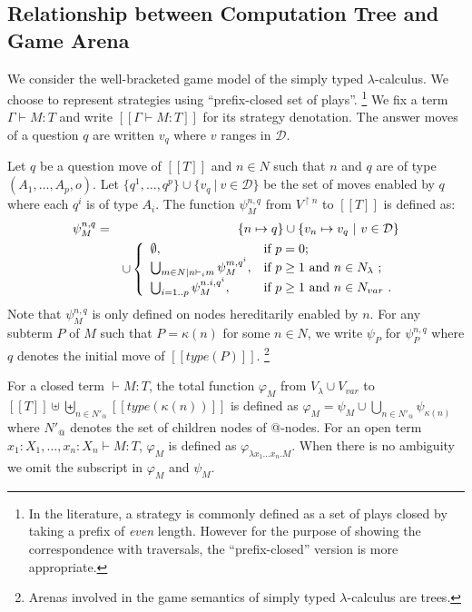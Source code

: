 \documentclass{llncs}
\newcommand\union{\cup}
\newcommand\Union{\bigcup}
\newcommand{\sem}[1]{{[\![ #1 ]\!]}}
\begin{document}
\subsection{Relationship between Computation Tree and Game Arena}
We consider the well-bracketed game model of the simply typed $\lambda$-calculus.
We choose to represent strategies using ``prefix-closed set of plays''.
\footnote{In the literature, a strategy is commonly defined as a set of plays
closed by taking a prefix of \emph{even} length. However for the purpose of showing the correspondence with traversals, the ``prefix-closed'' version is more appropriate.}
We fix a term $\Gamma \vdash M : T$ and write $\sem{\Gamma \vdash M : T}$ for its strategy denotation.
The answer moves of a question $q$ are written $v_q$ where $v$ ranges in $\mathcal{D}$.

\begin{definition}
\label{def:phi_psi mapping}
Let $q$ be a question move of $\sem{T}$ and $n \in N$ such that $n$ and $q$ are of type
$(A_1,\ldots,A_p,o)$.
Let $\{ q^1, \ldots, q^p \} \union \{  v_q \ | \ v \in \mathcal{D} \}$ be the set of moves enabled by $q$ where each $q^i$
is of type $A_i$. The function $\psi_M^{n,q}$ from $V^{\upharpoonright n}$ to $\sem{T}$ is defined as:
\begin{eqnarray*}
\psi^{n,q}_M &=& \{ n \mapsto q \} \union  \{ v_n \mapsto v_q \ | \ v \in \mathcal{D} \}\\
 &&\union \left\{
                \begin{array}{ll}
                  \emptyset, & \hbox{if $p=0$;} \\
                  \Union_{m \in N | n \vdash_i m} \psi_M^{m, q^i}, & \hbox{if $p\geq1$ and $n\in N_{\lambda}$\ ;} \\
                  \Union_{i=1..p} \psi_M^{n.i, q^i}, & \hbox{if $p\geq1$ and $n\in N_{var}$\ .}
                \end{array}
              \right.
\end{eqnarray*}
Note that $\psi_M^{n,q}$ is only defined on nodes hereditarily enabled by $n$.
For any subterm $P$ of $M$ such that $P = \kappa(n)$ for some $n \in N$,
we write $\psi_P$ for $\psi_P^{n,q}$ where $q$ denotes the initial move of $\sem{type(P)}$. \footnote{Arenas involved in the game semantics of simply typed $\lambda$-calculus are trees.}


For a closed term $\vdash M : T$, the total function $\varphi_M$ from $V_\lambda \union V_{var}$ to $\sem{T} \uplus \biguplus_{n \in N'_@} \sem{type(\kappa(n))}$ is defined as
$
\varphi_M = \psi_M
 \union \Union_{n \in N'_@} \psi_{\kappa(n)}
$
where $N'_@$ denotes the set of children nodes of @-nodes.
For an open term $x_1 : X_1, \ldots, x_n : X_n \vdash M : T$, $\varphi_M$ is defined as
$\varphi_{\lambda x_1 \ldots x_n . M}$. When there is no ambiguity we omit the subscript in $\varphi_M$ and $\psi_M$.
\end{definition}
\end{document}
